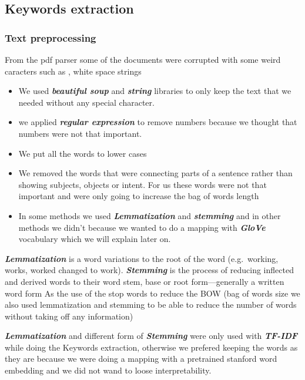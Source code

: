 \documentclass[journal,twocolumn]{IEEEtran}
\begin{document}
    \hypertarget{keywords-extraction}{%
\subsection{Keywords extraction}\label{keywords-extraction}}

    \hypertarget{text-preprocessing}{%
\subsubsection{Text preprocessing}\label{text-preprocessing}}

    From the pdf parser some of the documents were corrupted with some weird
caracters such as , white space strings

\begin{itemize}
\item
  We used \textbf{\emph{beautiful soup}} and \textbf{\emph{string}}
  libraries to only keep the text that we needed without any special
  character.
\item
  we applied \textbf{\emph{regular expression}} to remove numbers
  because we thought that numbers were not that important.
\item
  We put all the words to lower cases
\item
  We removed the words that were connecting parts of a sentence rather
  than showing subjects, objects or intent. For us these words were not
  that important and were only going to increase the bag of words length
\item
  In some methods we used \textbf{\emph{Lemmatization}} and
  \textbf{\emph{stemming}} and in other methods we didn't because we
  wanted to do a mapping with \textbf{\emph{GloVe}} vocabulary which we
  will explain later on.
\end{itemize}

\textbf{\emph{Lemmatization}} is a word variations to the root of the
word (e.g.~working, works, worked changed to work).
\textbf{\emph{Stemming}} is the process of reducing inflected and
derived words to their word stem, base or root form---generally a
written word form As the use of the stop words to reduce the BOW (bag of
words size we also used lemmatization and stemming to be able to reduce
the number of words without taking off any information)

    \textbf{\emph{Lemmatization}} and different form of
\textbf{\emph{Stemming}} were only used with \textbf{\emph{TF-IDF}}
while doing the Keywords extraction, otherwise we prefered keeping the
words as they are because we were doing a mapping with a pretrained
stanford word embedding and we did not wand to loose interpretability.
\end{document}

